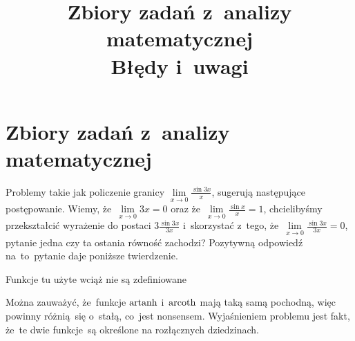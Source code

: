\documentclass[a4paper,11pt]{article}
\title{Zbiory zadań z~analizy matematycznej \\
  Błędy i~uwagi}
\begin{document}





\maketitle  %





\newpage
\section{Zbiory zadań z~analizy matematycznej}

\vspace{\spaceTwo}







\start {} Problemy takie jak policzenie granicy
$\lim\limits_{ x \to 0 } \frac{ \sin 3 x }{ x }$, sugerują następujące
postępowanie. Wiemy, że~$\lim\limits_{ x \to 0 } 3x = 0$ oraz
że~$\lim\limits_{ x \to 0 } \frac{ \sin x }{ x } = 1$, chcielibyśmy
przekształcić wyrażenie do postaci $3 \frac{ \sin 3x }{ 3x }$
i~skorzystać z~tego, że~$\lim\limits_{ x \to 0 } \frac{ \sin 3x }{ 3x } = 0$,
pytanie jedna czy ta ostania równość zachodzi? Pozytywną odpowiedź
na~to~pytanie daje poniższe twierdzenie.

Funkcje tu użyte wciąż nie są zdefiniowane

\vspace{\spaceFour}



\start {} Można
zauważyć, że~funkcje $\operatorname{artanh}$ i~$\operatorname{arcoth}$ mają taką samą pochodną,
więc powinny różnią~się o~stałą, co~jest nonsensem. Wyjaśnieniem
problemu jest fakt, że~te dwie funkcje~są określone na rozłącznych
dziedzinach.

\vspace{\spaceFour}
\end{document}
